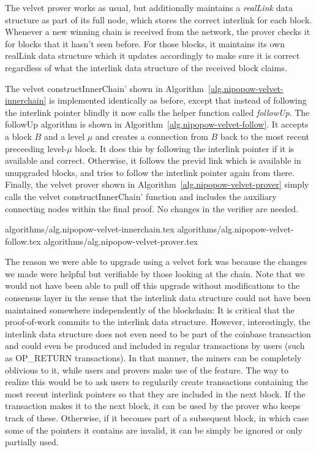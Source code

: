 The velvet prover works as usual, but additionally maintains a
\textit{realLink} data structure as part of its full node, which stores the
correct interlink for each block.  Whenever a new winning chain is received
from the network, the prover checks it for blocks that it hasn't seen before.
For those blocks, it maintains its own realLink data structure which it updates
accordingly to make sure it is correct regardless of what the interlink data
structure of the received block claims.

The velvet constructInnerChain' shown in
Algorithm~\ref{alg.nipopow-velvet-innerchain} is implemented identically as
before, except that instead of following the interlink pointer blindly it now
calls the helper function called \textit{followUp}. The followUp algorithm is
shown in Algorithm~\ref{alg.nipopow-velvet-follow}. It
accepts a block $B$ and a level $\mu$ and creates a connection from $B$ back to
the most recent preceeding level-$\mu$ block. It does this by following the
interlink pointer if it is available and correct. Otherwise, it follows the
previd link which is available in unupgraded blocks, and tries to follow the
interlink pointer again from there. Finally, the velvet prover shown in
Algorithm~\ref{alg.nipopow-velvet-prover} simply calls the velvet
constructInnerChain' function and includes the auxiliary connecting nodes
within the final proof. No changes in the verifier are needed.

{algorithms/alg.nipopow-velvet-innerchain.tex}
{algorithms/alg.nipopow-velvet-follow.tex}
{algorithms/alg.nipopow-velvet-prover.tex}

The reason we were able to upgrade using a velvet fork was because the changes
we made were helpful but verifiable by those looking at the chain. Note that we
would not have been able to pull off this upgrade without modifications to the
consensus layer in the sense that the interlink data structure could not have
been maintained somewhere independently of the blockchain: It is critical that
the proof-of-work commits to the interlink data structure. However,
interestingly, the interlink data structure does not even need to be part of
the coinbase transaction and could even be produced and included in regular
transactions by users (such as OP\_RETURN transactions). In that manner, the
miners can be completely oblivious to it, while users and provers make use of
the feature. The way to realize this would be to ask users to regularily create
transactions containing the most recent interlink pointers so that they are
included in the next block. If the transaction makes it to the next block, it
can be used by the prover who keeps track of these. Otherwise, if it becomes
part of a subsequent block, in which case some of the pointers it contains are
invalid, it can be simply be ignored or only partially used.

